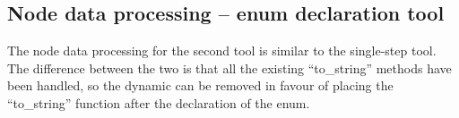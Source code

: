 \subsection{Node data processing -- enum declaration tool}

The node data processing for the second tool is similar to the single-step tool. The difference between the two is that all the existing ``to\_string'' methods have been handled, so the dynamic  can be removed in favour of placing the ``to\_string'' function after the declaration of the enum.